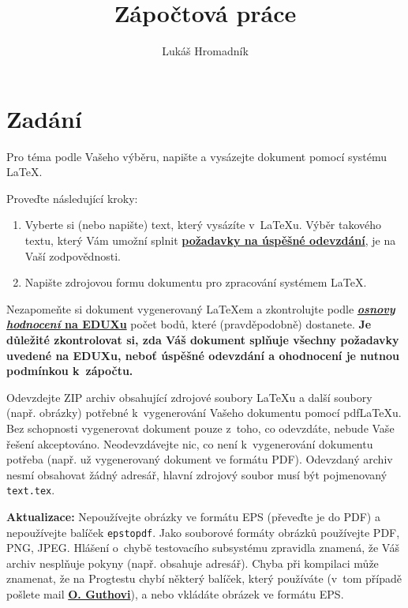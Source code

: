 \documentclass[a4paper,11pt]{article}
\title{Zápočtová práce}
\author{Lukáš Hromadník}
\begin{document}
\maketitle

\newpage

\section{Zadání}

Pro téma podle Vašeho výběru, napište a vysázejte dokument pomocí systému \LaTeX{}.

Proveďte následující kroky:
\begin{enumerate}
	\item Vyberte si (nebo napište) text, který vysázíte v~\LaTeX{}u. Výběr takového textu, který Vám umožní splnit \href{https://edux.fit.cvut.cz/courses/BI-TED/seminars/01/start#ulohasazba_textu}{\textbf{požadavky na úspěšné odevzdání}}, je na Vaší zodpovědnosti.
	\item Napište zdrojovou formu dokumentu pro zpracování systémem \LaTeX{}.
\end{enumerate}

Nezapomeňte si dokument vygenerovaný \LaTeX{}em a zkontrolujte podle \href{https://edux.fit.cvut.cz/courses/BI-TED/tutorials/01/start#uloha_-_sazba_textu}{\textbf{\textit{osnovy hodnocení} na EDUXu}} počet bodů, které (pravděpodobně) dostanete. \textbf{Je důležité zkontrolovat si, zda Váš dokument splňuje všechny požadavky uvedené na EDUXu, neboť úspěšné odevzdání a ohodnocení je nutnou podmínkou k~zápočtu.}

Odevzdejte ZIP archiv obsahující zdrojové soubory \LaTeX{}u a další soubory (např. obrázky) potřebné k~vygenerování Vašeho dokumentu pomocí pdf\LaTeX{}u. Bez schopnosti vygenerovat dokument pouze z~toho, co odevzdáte, nebude Vaše řešení akceptováno. Neodevzdávejte nic, co není k~vygenerování dokumentu potřeba (např. už vygenerovaný dokument ve formátu PDF). Odevzdaný archiv nesmí obsahovat žádný adresář, hlavní zdrojový soubor musí být pojmenovaný \verb|text.tex|.

\textbf{Aktualizace:} Nepoužívejte obrázky ve formátu EPS (převeďte je do PDF) a nepoužívejte balíček \verb|epstopdf|. Jako souborové formáty obrázků používejte PDF, PNG, JPEG. Hlášení o~chybě testovacího subsystému zpravidla znamená, že Váš archiv nesplňuje pokyny (např. obsahuje adresář). Chyba při kompilaci může znamenat, že na Progtestu chybí některý balíček, který používáte (v~tom případě pošlete mail \href{mailto:ondrej.guth@fit.cvut.cz}{\textbf{O. Guthovi}}), a nebo vkládáte obrázek ve formátu EPS.
\end{document}
